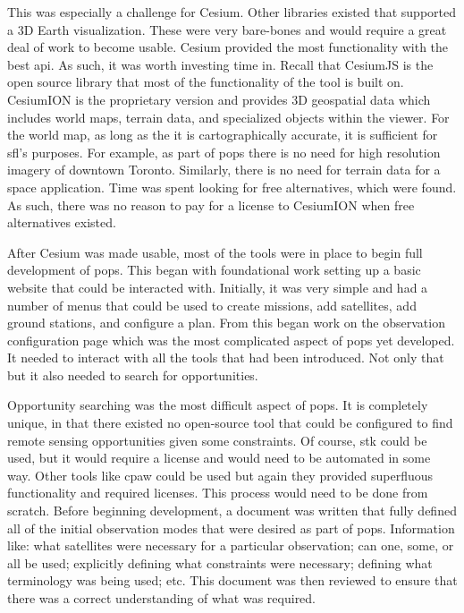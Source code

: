 This was especially a challenge for Cesium. Other libraries existed that
supported a 3D Earth visualization. These were very bare-bones and would
require a great deal of work to become usable. Cesium provided the most
functionality with the best \gls{api}. As such, it was worth investing time in.
Recall that CesiumJS is the open source library that most of the functionality
of the tool is built on. CesiumION is the proprietary version and provides 3D
geospatial data which includes world maps, terrain data, and specialized
objects within the viewer.  For the world map, as long as the it is
cartographically accurate, it is sufficient for \gls{sfl}'s purposes. For
example, as part of \gls{pops} there is no need for high resolution imagery of
downtown Toronto.  Similarly, there is no need for terrain data for a space
application.  Time was spent looking for free alternatives, which were found.
As such, there was no reason to pay for a license to CesiumION when free
alternatives existed.

After Cesium was made usable, most of the tools were in place to begin full
development of \gls{pops}. This began with foundational work setting up a basic
website that could be interacted with. Initially, it was very simple and had a
number of menus that could be used to create missions, add satellites, add
ground stations, and configure a plan. From this began work on the observation
configuration page which was the most complicated aspect of \gls{pops} yet
developed. It needed to interact with all the tools that had been introduced.
Not only that but it also needed to search for opportunities.

Opportunity searching was the most difficult aspect of \gls{pops}. It is
completely unique, in that there existed no open-source tool that could be
configured to find remote sensing opportunities given some constraints. Of
course, \gls{stk} could be used, but it would require a license and would need
to be automated in some way. Other tools like \gls{cpaw} could be used but
again they provided superfluous functionality and required licenses. This
process would need to be done from scratch. Before beginning development, a
document was written that fully defined all of the initial observation modes
that were desired as part of \gls{pops}. Information like: what satellites were
necessary for a particular observation; can one, some, or all be used;
explicitly defining what constraints were necessary; defining what terminology
was being used; etc. This document was then reviewed to ensure that there was a
correct understanding of what was required.

